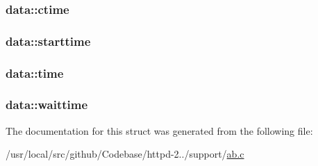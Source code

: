 \subsubsection[{\texorpdfstring{ctime}{ctime}}]{ data\+::ctime}\hypertarget{structdata_a7d2d3222d1e8173da6a2cc134f9308ec}{}\label{structdata_a7d2d3222d1e8173da6a2cc134f9308ec}
\subsubsection[{\texorpdfstring{starttime}{starttime}}]{ data\+::starttime}\hypertarget{structdata_aebd46d8f93c96c2fbbb3bc62e153a260}{}\label{structdata_aebd46d8f93c96c2fbbb3bc62e153a260}
\subsubsection[{\texorpdfstring{time}{time}}]{ data\+::time}\hypertarget{structdata_a3c20026bdb9bf7b5f67ece0f2d6d8bec}{}\label{structdata_a3c20026bdb9bf7b5f67ece0f2d6d8bec}
\subsubsection[{\texorpdfstring{waittime}{waittime}}]{ data\+::waittime}\hypertarget{structdata_aa5f8354facabf372a13d198ba10367fd}{}\label{structdata_aa5f8354facabf372a13d198ba10367fd}


The documentation for this struct was generated from the following file\+:\begin{DoxyCompactItemize}
\item 
/usr/local/src/github/\+Codebase/httpd-\/2../support/\hyperlink{ab_8c}{ab.\+c}\end{DoxyCompactItemize}
